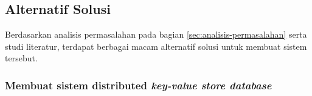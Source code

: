 \subsection{Alternatif Solusi}
\label{sec:alternatif-solusi}

Berdasarkan analisis permasalahan pada bagian \ref{sec:analisis-permasalahan} serta studi literatur, terdapat berbagai macam alternatif solusi untuk membuat sistem tersebut.

\subsubsection{Membuat sistem distributed \textit{key-value store database}}
